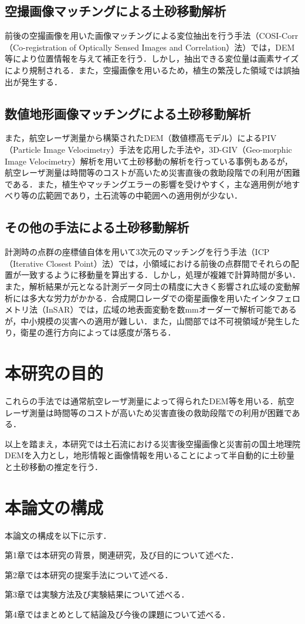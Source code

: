     \cite{土砂移動解析1}
    \cite{土砂移動解析2}
    \cite{土砂移動解析3}
    \cite{土砂移動解析4}
    \cite{土砂移動解析5}
    \cite{土砂移動解析6}
  
  

    \subsection{空撮画像マッチングによる土砂移動解析}
      前後の空撮画像を用いた画像マッチングによる変位抽出を行う手法（COSI-Corr（Co-registration of Optically Sensed Images and Correlation）法）\cite{土砂移動解析1}では，DEM等により位置情報を与えて補正を行う．しかし，抽出できる変位量は画素サイズにより規制される．また，空撮画像を用いるため，植生の繁茂した領域では誤抽出が発生する．

    \subsection{数値地形画像マッチングによる土砂移動解析}
      また，航空レーザ測量から構築されたDEM（数値標高モデル）によるPIV（Particle Image Velocimetry）手法\cite{土砂移動解析2}を応用した手法や，3D-GIV（Geo-morphic Image Velocimetry）解析\cite{土砂移動解析3, 土砂移動解析4, 土砂移動解析5}を用いて土砂移動の解析を行っている事例もあるが，航空レーザ測量は時間等のコストが高いため災害直後の救助段階での利用が困難である．また，植生やマッチングエラーの影響を受けやすく，主な適用例が地すべり等の広範囲であり，土石流等の中範囲への適用例が少ない．

    \subsection{その他の手法による土砂移動解析}
      計測時の点群の座標値自体を用いて3次元のマッチングを行う手法（ICP（Iterative Closest Point）法）\cite{土砂移動解析6}では，小領域における前後の点群間でそれらの配置が一致するように移動量を算出する．しかし，処理が複雑で計算時間が多い．また，解析結果が元となる計測データ同士の精度に大きく影響され広域の変動解析には多大な労力がかかる．合成開口レーダでの衛星画像を用いたインタフェロメトリ法（InSAR）\cite{土砂移動解析7}では，広域の地表面変動を数mmオーダーで解析可能であるが，中小規模の災害への適用が難しい．また，山間部では不可視領域が発生したり，衛星の進行方向によっては感度が落ちる．


  \section{本研究の目的}
    これらの手法では通常航空レーザ測量によって得られたDEM等を用いる．航空レーザ測量は時間等のコストが高いため災害直後の救助段階での利用が困難である．

    以上を踏まえ，本研究では土石流における災害後空撮画像と災害前の国土地理院DEM\cite{基盤地図情報}を入力とし，地形情報と画像情報を用いることによって半自動的に土砂量と土砂移動の推定を行う．


  \section{本論文の構成}
    本論文の構成を以下に示す．
    
    第1章では本研究の背景，関連研究，及び目的について述べた．

    第2章では本研究の提案手法について述べる．

    第3章では実験方法及び実験結果について述べる．

    第4章ではまとめとして結論及び今後の課題について述べる．
